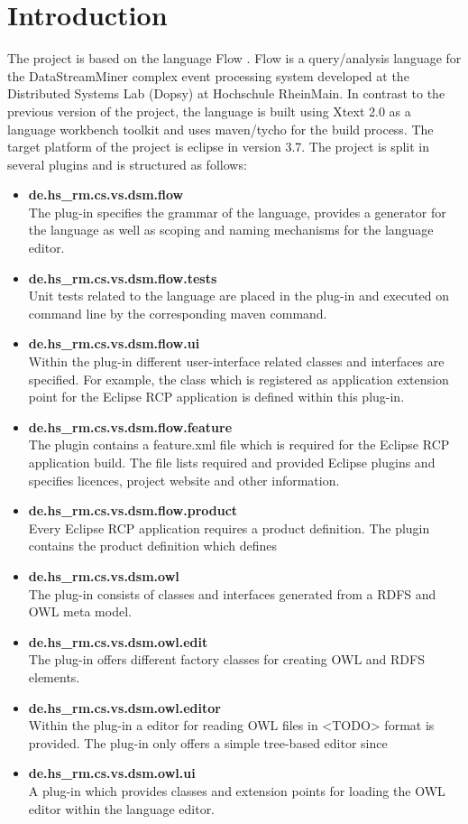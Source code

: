 \section{Introduction}
The project is based on the language Flow \cite{297:Frey2010}. Flow is a 
query/analysis language for the DataStreamMiner complex event processing system 
developed at the Distributed Systems Lab (Dopsy) at Hochschule RheinMain. In contrast to 
the previous version of the project, the language is built using Xtext 2.0 as a
language workbench toolkit and uses maven/tycho for the build process. The 
target platform of the project is eclipse in version 3.7. The project is split 
in several plugins and is structured as follows:
\begin{itemize}
  \item \textbf{de.hs\_rm.cs.vs.dsm.flow} \\
  The plug-in specifies the grammar of the language, provides a generator for 
  the language as well as scoping and naming mechanisms for the language editor.
  \item \textbf{ de.hs\_rm.cs.vs.dsm.flow.tests} \\
  Unit tests related to the language are placed in the plug-in and executed on 
  command line by the corresponding maven command.
  \item \textbf{de.hs\_rm.cs.vs.dsm.flow.ui} \\
  Within the plug-in different user-interface related classes and interfaces are
  specified. For example, the class which is registered as application extension 
  point for the Eclipse RCP application is defined within this plug-in.
  \item \textbf{de.hs\_rm.cs.vs.dsm.flow.feature} \\
  The plugin contains a feature.xml file which is required for the Eclipse RCP 
  application build. The file lists required and provided Eclipse plugins and 
  specifies licences, project website and other information.
  \item \textbf{de.hs\_rm.cs.vs.dsm.flow.product} \\
  Every Eclipse RCP application requires a product definition. The plugin 
  contains the product definition which defines
  \item \textbf{de.hs\_rm.cs.vs.dsm.owl} \\
  The plug-in consists of classes and interfaces generated from a RDFS and OWL 
  meta model.
  \item \textbf{de.hs\_rm.cs.vs.dsm.owl.edit} \\
  The plug-in offers different factory classes for creating OWL and RDFS 
  elements.
  \item \textbf{de.hs\_rm.cs.vs.dsm.owl.editor} \\
  Within the plug-in a editor for reading OWL files in <TODO> format is 
  provided. The plug-in only offers a simple tree-based editor since
  \item \textbf{de.hs\_rm.cs.vs.dsm.owl.ui} \\
  A plug-in which provides classes and extension points for loading the OWL 
  editor within the language editor. 
\end{itemize}
